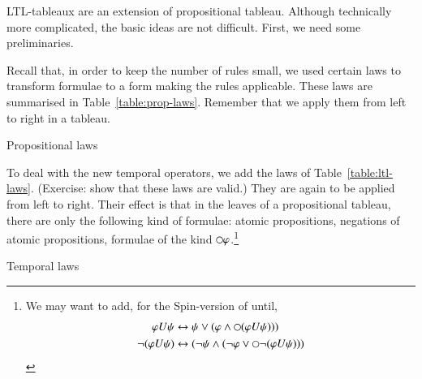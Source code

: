 LTL-tableaux are an extension of propositional tableau. Although
technically more complicated, the basic ideas are not
difficult. First,  we need some preliminaries.

\medskip\noindent Recall that, in order to keep the number of rules
small, we used certain laws to transform formulae to a form making the
rules applicable. These laws are summarised in
Table~\ref{table:prop-laws}.  Remember that we apply them from left to
right in a tableau.

\begin{table}
\fbox{\parbox{\textwidth}{
\begin{align*}
(\phi\biimp\psi) & \biimp  (\phi\imp \psi)\et(\psi\imp \phi)\\
\neg(\phi\ou\psi)& \biimp \neg\phi\et\neg\psi\\
\neg(\phi\et\psi)& \biimp \neg\phi\ou\neg\psi\\
\phi\imp\psi &\biimp \neg\phi\ou\psi\\
\neg(\phi\imp\psi)&\biimp \phi\et\neg\psi
\end{align*}
}}
\caption{Propositional laws}\label{table:prop-laws}
\end{table}

\medskip\noindent To deal with the new temporal operators, we add the
laws of Table~\ref{table:ltl-laws}. (Exercise: show that these laws
are valid.) They are again to be applied from left to right. Their
effect is that in the leaves of a propositional tableau, there are
only the following kind of formulae: atomic propositions, negations of
atomic propositions, formulae of the kind $\next\phi$.\footnote{We may
  want to add, for the Spin-version of until,
\begin{align*}
  \phi U\psi & \biimp \psi \ou (\phi\et\next(\phi U\psi)))\\
  \neg(\phi U\psi) & \biimp (\neg\psi \et (\neg\phi\ou
  \next\neg(\phi U\psi)))
\end{align*}
}

%
\begin{table}
  \fbox{\parbox{\textwidth}{
      \begin{align*}
        \neg\next\phi & \biimp \next\neg\phi \\
        \neg\Diamond\phi & \biimp \Box\neg\phi \\
        \neg\Box\phi & \biimp \Diamond\neg\phi\\
        \Diamond\phi & \biimp \phi\ou\next\Diamond\phi \\
        \Box\phi & \biimp \phi\et\next\Box\phi\\
        \phi\until\psi & \biimp \next(\psi \ou (\phi\et(\phi\until\psi)))\\
        \neg(\phi\until\psi) & \biimp \next(\neg\psi \et(\neg\phi\ou
        \neg(\phi\until\psi)))
\end{align*}
}}
\caption{Temporal laws}\label{table:ltl-laws}
\end{table}


